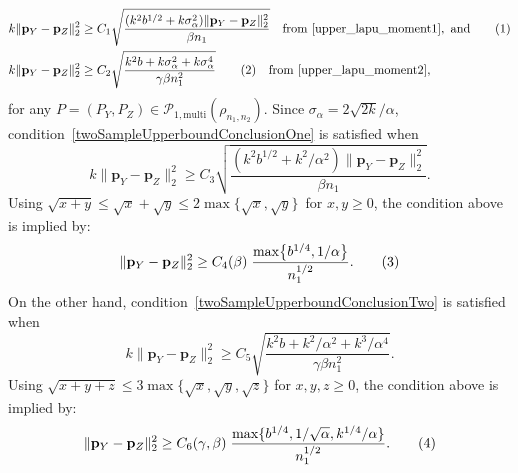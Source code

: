 \documentclass[twoside,11pt]{article}
\newcommand\numberthis{\addtocounter{equation}{1}\tag{\theequation}}
\newcommand{\rvTwo}{Y}
\newcommand{\rvThree}{Z}
\newcommand{\alphabetSize}{k} %
\newcommand{\sampleSize}{n}
\newcommand{\probVec}{\mathbf{p}} %
\newcommand{\privacyParameter}{\alpha} %
\newcommand{\LapUParam}{\sigma_{\privacyParameter}}
\begin{document}
\begin{appendix}
\begin{itemize}
\begin{align*}
		\alphabetSize \| \probVec_\rvTwo - \probVec_\rvThree \|_2^2
		&\geq
		C_1
		\sqrt{
			\frac{({\alphabetSize}^2 {b}^{1/2} + {\alphabetSize}
				\LapUParam^2) \| \probVec_\rvTwo - \probVec_\rvThree \|_2^2}{ \beta \sampleSize_1}} \quad \text{from}~\eqref{upper_lapu_moment1},~\text{and} 
		\numberthis\label{twoSampleUpperboundConclusionOne}
		\\
		\alphabetSize \| \probVec_\rvTwo - \probVec_\rvThree \|_2^2
		&\geq
		C_2
		\sqrt{
			\frac{{\alphabetSize}^2
				{b} + \alphabetSize \LapUParam^2 + \alphabetSize \LapUParam^4
			}{ \gamma \beta \sampleSize_1^2}}	
		\numberthis\label{twoSampleUpperboundConclusionTwo} \quad \text{from}~\eqref{upper_lapu_moment2},
	\end{align*}
	for any  $P = (P_{Y}, P_{Z}) \in \mathcal{P}_{1,\mathrm{multi}}(\rho_{\sampleSize_1,\sampleSize_2})$.
	Since $\LapUParam = 2 \sqrt{2 \alphabetSize}  / \privacyParameter$,
	condition~\eqref{twoSampleUpperboundConclusionOne} is satisfied when
	$$
	\alphabetSize \| \probVec_\rvTwo - \probVec_\rvThree \|_2^2
	\geq
	C_3
	\sqrt{
		\frac
		{({\alphabetSize}^2 {b}^{1/2}
			+
			{\alphabetSize}^2 /\privacyParameter^2) \| \probVec_\rvTwo - \probVec_\rvThree \|_2^2}
		{\beta \sampleSize_1}}.
	$$
	Using  $\sqrt{x+y} \leq \sqrt{x} + \sqrt{y} \leq 2 \max\{\sqrt{x}, \sqrt{y}\}$~for $x,y \geq 0$, the condition above is implied by:
	\begin{align*}
		\| \probVec_\rvTwo - \probVec_\rvThree \|_2^2 
		\geq
		C_4(\beta)
		\;
		\frac{
			\max \bigl\{ {b}^{1/4},  1/\privacyParameter \bigr\}
		}{
			\sampleSize_1^{1/2}}.
		\numberthis\label{equation:prelim_max_1}
	\end{align*}
	On the other hand,
	condition~\eqref{twoSampleUpperboundConclusionTwo} is satisfied when 
	$$
	\alphabetSize \| \probVec_\rvTwo - \probVec_\rvThree \|_2^2
	\geq
	C_5 \sqrt{
		\frac{{\alphabetSize}^2
			{b} + 
			\alphabetSize^2 / \privacyParameter^2 +
			\alphabetSize^3 / \privacyParameter^4
		}{\gamma \beta \sampleSize_1^2}}.
	$$ 
	Using $\sqrt{x+y+z} \leq 3 \max\{ \sqrt{x},  \sqrt{y}, \sqrt{z}\}$ for $x, y, z \geq 0$, the condition above is implied by:
	\begin{align*}
		\| \probVec_\rvTwo - \probVec_\rvThree \|_2^2 
		\geq 
		C_6(\gamma, \beta) \;
		\frac{
			\max \{{b}^{1/4}, 1/\sqrt{\privacyParameter}, \alphabetSize^{1/4} / \privacyParameter \}
		}{ \sampleSize_1^{1/2}}.
		\numberthis\label{equation:prelim_max_2}

\end{align*}
\end{itemize}
\end{appendix}
\end{document}
